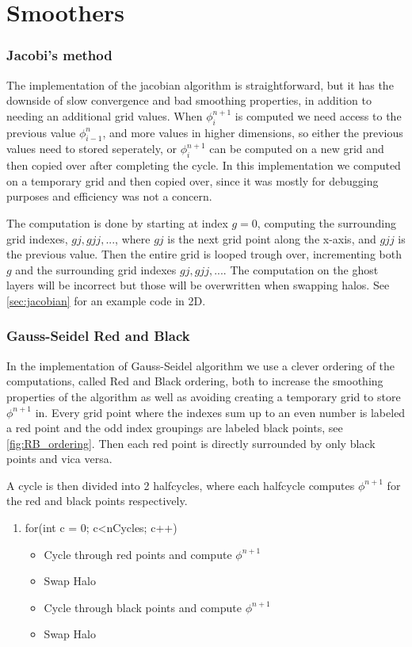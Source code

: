 
	\section{Smoothers}
		\subsubsection{Jacobi's method}
		The implementation of the jacobian algorithm is straightforward, but it has the downside of slow convergence and
		bad smoothing properties, in addition to needing an additional grid values. When \(\phi^{n+1}_{i}\) is computed
		we need access to the previous value \(\phi^n_{i-1}\), and more values in higher dimensions, so either the previous values
		need to stored seperately, or \(\phi^{n+1}_{i}\) can be computed on a new grid and then copied over after completing the cycle.
		In this implementation we computed on a temporary grid and then copied over, since it was mostly for debugging purposes and
		efficiency was not a concern.

		The computation is done by starting at index \(g=0\), computing the surrounding grid indexes, \(gj, gjj,...\), where \(gj\)
		is the next grid point along the x-axis, and \(gjj\) is the previous value. Then the entire grid is looped trough over, incrementing
		both \(g\) and the surrounding grid indexes \(gj, gjj,...\). The computation on the ghost layers will be incorrect but those will be overwritten
		when swapping halos. See \ref{sec:jacobian} for an example code in 2D.

		\subsubsection{Gauss-Seidel Red and Black}
		In the implementation of Gauss-Seidel algorithm we use a clever ordering of the computations,
		called Red and Black ordering, both to increase the smoothing properties of the algorithm as well as avoiding
 		creating a temporary grid to store \(\phi^{n+1}\) in. Every grid point where the indexes sum up to an even number
		is labeled a red point and the odd index groupings are labeled black points, see \cref{fig:RB_ordering}. Then
		each red point is directly surrounded by only black points and vica versa.

		A cycle is then divided into 2 halfcycles, where each halfcycle computes \(\phi^{n+1}\) for the red and black points respectively.

		\begin{enumerate}
			\item for(int c = 0; c<nCycles; c++)
				\begin{itemize}
					\item Cycle through red points and compute \(\phi^{n+1}\)
					\item Swap Halo
					\item Cycle through black points and compute \(\phi^{n+1}\)
					\item Swap Halo
				\end{itemize}
		\end{enumerate}

